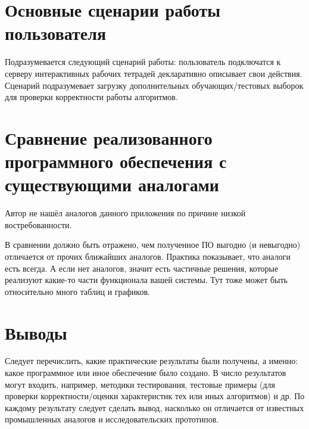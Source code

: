 \section{Основные сценарии работы пользователя}
\begin{annotation}
	Подразумевается следующий сценарий работы: пользователь подключатся к серверу интерактивных рабочих тетрадей декларативно описывает свои действия. Сценарий подразумевает загрузку дополнительных обучающих/тестовых выборок для проверки корректности работы алгоритмов.
\end{annotation}

\section{Сравнение реализованного программного обеспечения с существующими аналогами}
\begin{annotation}
	Автор не нашёл аналогов данного приложения по причине низкой востребованности.
\end{annotation}

В сравнении должно быть отражено, чем полученное ПО выгодно (и невыгодно) отличается от прочих ближайших аналогов. Практика показывает, что аналоги есть всегда. А если нет аналогов, значит есть частичные решения, которые реализуют какие-то части функционала вашей системы. Тут тоже может быть относительно много таблиц и графиков.



\section{Выводы}

Следует перечислить, какие практические результаты были получены, а именно: какое программное или иное обеспечение было создано. В число результатов могут входить, например, методики тестирования, тестовые примеры (для проверки корректности/оценки характеристик тех или иных алгоритмов) и др. По каждому результату следует сделать вывод, насколько он отличается от известных промышленных аналогов и исследовательских прототипов.

